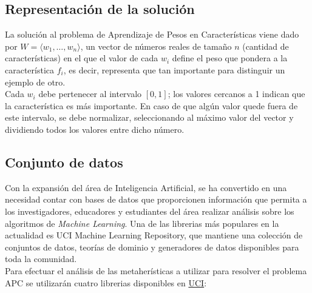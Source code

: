 \documentclass{ci5652}
\begin{document}

\subsection{Representación de la solución}

La solución al problema de Aprendizaje de Pesos en Características viene dado 
por $W = \langle w_1, \dots, w_n\rangle$, un vector de números reales de tamaño
$n$ (cantidad de características) en el que el valor de cada $w_i$  define el
peso que pondera a la  característica $f_i$, es decir, representa que tan
importante para distinguir un ejemplo de otro.\\

Cada $w_i$ debe pertenecer al intervalo $[0,1]$; los valores cercanos a 1 indican
que la característica es más importante. En caso de que algún valor quede fuera
de este intervalo, se debe normalizar, seleccionando al máximo valor del vector
y dividiendo todos los valores entre dicho número. 


\subsection{Conjunto de datos}

Con la expansión del área de Inteligencia Artificial, se ha convertido en una
necesidad contar con bases de datos que proporcionen información que permita a
los investigadores, educadores y estudiantes del área realizar análisis sobre 
los algoritmos de \textit{Machine Learning}. Una de las librerias más populares
en la actualidad es UCI Machine Learning Repository, que mantiene una colección
de conjuntos de datos, teorías de dominio y generadores de datos disponibles 
para toda la comunidad.\\

Para efectuar el análisis de las metaherísticas a utilizar para resolver el
problema APC se utilizarán cuatro librerias disponibles en 
\href{http://archive.ics.uci.edu/ml/index.php}{UCI}:
\end{document}
